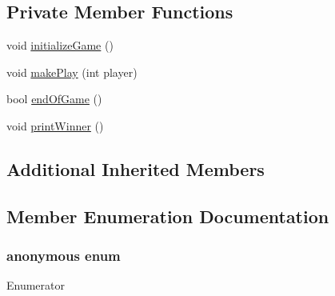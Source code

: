 \subsection*{Private Member Functions}
\begin{DoxyCompactItemize}
\item 
void \hyperlink{classwikibooks__design__patterns_1_1Monopoly_a9fa4e1a5c85d7b9f1e2b1fdf4d1911ab}{initialize\+Game} ()
\item 
void \hyperlink{classwikibooks__design__patterns_1_1Monopoly_ab885dd62ab49fba54bd2ce542702caaa}{make\+Play} (int player)
\item 
bool \hyperlink{classwikibooks__design__patterns_1_1Monopoly_ab533fb92f64065d8cae9a731e6fe789d}{end\+Of\+Game} ()
\item 
void \hyperlink{classwikibooks__design__patterns_1_1Monopoly_affb4f25920e5d5887a62b33606bec042}{print\+Winner} ()
\end{DoxyCompactItemize}
\subsection*{Additional Inherited Members}


\subsection{Member Enumeration Documentation}
\subsubsection[{\texorpdfstring{anonymous enum}{anonymous enum}}]{\setlength{\rightskip}{0pt plus 5cm}anonymous enum\hspace{0.3cm}{\ttfamily [private]}}\hypertarget{classwikibooks__design__patterns_1_1Monopoly_a503a2b1818164ca11be7cc029dcc84e6}{}\label{classwikibooks__design__patterns_1_1Monopoly_a503a2b1818164ca11be7cc029dcc84e6}
\begin{Desc}
\item[Enumerator]\par
\begin{description}
\item[{\em 
M\+O\+V\+E\+S\+\_\+\+W\+I\+N\+\_\+\+C\+O\+R\+R\+E\+C\+T\+I\+ON\hypertarget{classwikibooks__design__patterns_1_1Monopoly_a503a2b1818164ca11be7cc029dcc84e6a7f717a5237abe25eac65acce1a12d2f3}{}\label{classwikibooks__design__patterns_1_1Monopoly_a503a2b1818164ca11be7cc029dcc84e6a7f717a5237abe25eac65acce1a12d2f3}
}]\end{description}
\end{Desc}

